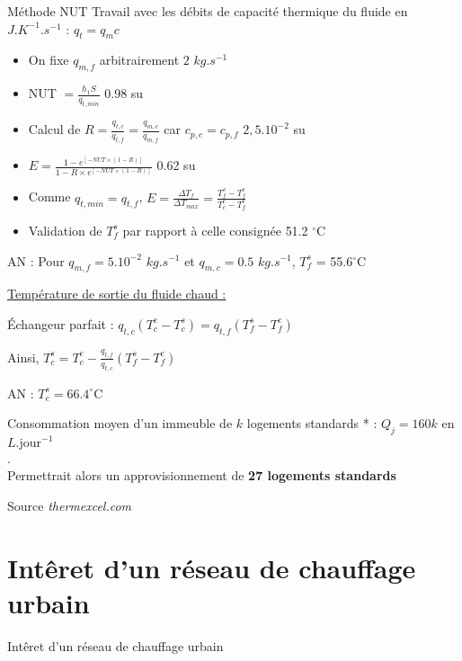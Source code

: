 \documentclass[hyperref={pdfpagelabels=false}]{beamer}
\begin{document}
\begin{frame}[noframenumbering]{Méthode NUT {\textcolor{ultramarine}{\hyperlink{a52}{}}} }
Travail avec les débits de capacité thermique du fluide en $J.K^{-1}.s^{-1}$ : $q_t = q_m c$
\begin{itemize}
\item On fixe $q_{m,f}$ arbitrairement {\color{ultramarine} $2$ $kg.s^{-1}$}
\item NUT $=\frac{h_1 S}{q_{t,min}}$  {\color{ultramarine} 0.98 su}
\item Calcul de $ R = \frac{q_{t,c}}{q_{t,f}} = \frac{q_{m,c}}{q_{m,f}}$ car $c_{p,c}=c_{p,f}$ {\color{ultramarine} $2,5 .10^{-2}$ su}
\item $E = \frac{1 -  e^{ [- NUT \times (1 - R)]}}{1 - R \times e^{ [- NUT \times (1 - R)] }}$ {\color{ultramarine} 0.62 su}
\item Comme $q_{t,min}=q_{t,f}$, $ E = \frac{\Delta T_f}{\Delta T_{max}} = \frac{T_f^s - T_f^e}{T_c^e - T_f^e}$
\item Validation de $T_f^s$ par rapport à celle consignée {\color{ultramarine} 51.2 $^{\circ}$C}
\end{itemize}
\end{frame}

\begin{frame}
AN : Pour $q_{m,f} = 5.10^{-2}$ $kg.s^{-1}$ et $q_{m,c} = 0.5 $  $kg.s^{-1}$, $T_f^s$ = 55.6$^{\circ}$C \par

\underline{Température de sortie du fluide chaud :} \par
Échangeur parfait : $q_{t,c} (T_c^e - T_c^s )  = q_{t,f} (T_f^s - T_f^e)$ \par
Ainsi, $T_c^s = T_c^e - \frac{ q_{t,f}}{q_{t,c}}(T_f^s - T_f^e)$ \par

AN : $T_c^s = 66.4^{\circ}$C  \par 

Consommation moyen d'un immeuble de $k$ logements standards * : $Q_j = 160 k$ en $L.{\text{jour}^{-1}}$ \\
{\color{white}.} \\
Permettrait alors un approvisionnement de \textbf{27 logements standards}\par 

\hfill{\footnotesize * Source \textit{thermexcel.com}}
\end{frame}


\section{Intêret d'un réseau de chauffage urbain}
\begin{frame}
\begin{center}
{\huge{Intêret d'un réseau de chauffage urbain}}\\
\end{center}
\end{frame}
\end{document}
